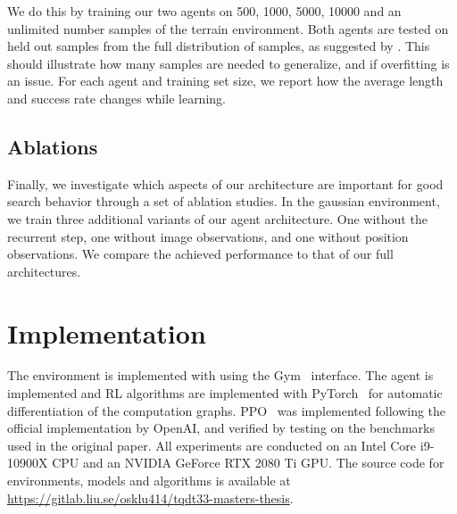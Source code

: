 We do this by training our two agents on 500, 1000, 5000, 10000 and an unlimited number samples of the terrain environment.
Both agents are tested on held out samples from the full distribution of samples, as suggested by \cite{cobbe_procgen_2020}.
This should illustrate how many samples are needed to generalize, and if overfitting is an issue.
For each agent and training set size, we report how the average length and success rate changes while learning.

\subsection{Ablations}
\label{sec:ablations}

Finally, we investigate which aspects of our architecture are important for good search behavior through a set of ablation studies.
In the gaussian environment, we train three additional variants of our agent architecture.
One without the recurrent step, one without image observations, and one without position observations.
We compare the achieved performance to that of our full architectures.

\section{Implementation}

The environment is implemented with using the Gym~\cite{brockman_gym_2016} interface. The agent is implemented and RL algorithms are implemented with PyTorch~\cite{paszke_pytorch_nodate} for automatic differentiation of the computation graphs.
PPO~\cite{schulman_ppo_2017} was implemented following the official implementation by OpenAI,
and verified by testing on the benchmarks used in the original paper.
All experiments are conducted on an Intel Core i9-10900X CPU and an NVIDIA GeForce RTX 2080 Ti GPU.
The source code for environments, models and algorithms is available at \url{https://gitlab.liu.se/osklu414/tqdt33-masters-thesis}.
